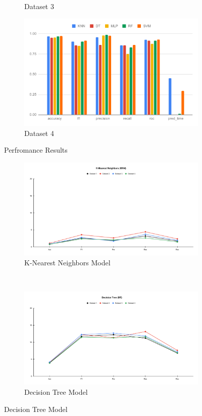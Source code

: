 \documentclass[a4paper,fleqn]{cas-dc}
\begin{document}
\begin{figure}[H]
\begin{subfigure}{\columnwidth}
        \caption{Dataset 3}\label{fig:performance_results_dataset_3}
    \end{subfigure}
    \begin{subfigure}{\columnwidth}
        \includegraphics[width=0.9\columnwidth]{perf_ds_4.pdf}
        \caption{Dataset 4}\label{fig:performance_results_dataset_4}
    \end{subfigure}
    \caption{Perfromance Results}\label{fig:performance_results}
\end{figure}

\begin{figure}[H]
    \begin{subfigure}{\textwidth}
        \includegraphics[width=0.9\columnwidth]{delta_KNN.pdf}
        \caption{K-Nearest Neighbors Model}\label{fig:performance_delta_knn}
    \end{subfigure}\\
    \begin{subfigure}{\textwidth}
        \includegraphics[width=0.9\columnwidth]{delta_DT.pdf}
        \caption{Decision Tree Model}\label{fig:performance_delta_dt}
    \end{subfigure}
\end{figure}
\end{document}
